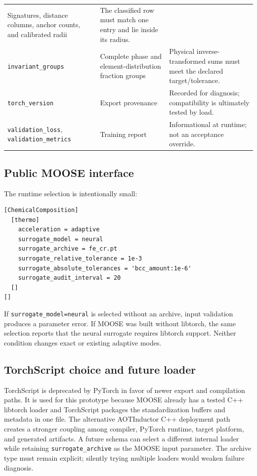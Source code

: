 \documentclass[11pt]{article}
\newcommand{\code}[1]{\texttt{#1}}
\begin{document}
\begin{longtable}{L{0.25\textwidth}L{0.27\textwidth}L{0.40\textwidth}}
  Signatures, distance columns, anchor counts, and calibrated radii &
  The classified row must match one entry and lie inside its radius. \\
  \code{invariant\_groups} &
  Complete phase and element-distribution fraction groups &
  Physical inverse-transformed sums must meet the declared target/tolerance. \\
  \code{torch\_version} &
  Export provenance &
  Recorded for diagnosis; compatibility is ultimately tested by load. \\
  \code{validation\_loss}, \code{validation\_metrics} &
  Training report &
  Informational at runtime; not an acceptance override. \\
  \bottomrule
\end{longtable}

\subsection{Public MOOSE interface}

The runtime selection is intentionally small:
\begin{lstlisting}[caption={MOOSE neural-surrogate selection.}]
[ChemicalComposition]
  [thermo]
    acceleration = adaptive
    surrogate_model = neural
    surrogate_archive = fe_cr.pt
    surrogate_relative_tolerance = 1e-3
    surrogate_absolute_tolerances = 'bcc_amount:1e-6'
    surrogate_audit_interval = 20
  []
[]
\end{lstlisting}

If \code{surrogate\_model=neural} is selected without an archive, input validation produces a
parameter error.  If MOOSE was built without libtorch, the same selection reports that the neural
surrogate requires libtorch support.  Neither condition changes exact or existing adaptive modes.

\subsection{TorchScript choice and future loader}

TorchScript is deprecated by PyTorch in favor of newer export and compilation paths.  It is used
for this prototype because MOOSE already has a tested C++ libtorch loader and TorchScript packages
the standardization buffers and metadata in one file.  The alternative AOTInductor C++ deployment
path creates a stronger coupling among compiler, PyTorch runtime, target platform, and generated
artifacts.  A future schema can select a different internal loader while retaining
\code{surrogate\_archive} as the MOOSE input parameter.  The archive type must remain explicit;
silently trying multiple loaders would weaken failure diagnosis.
\end{document}
